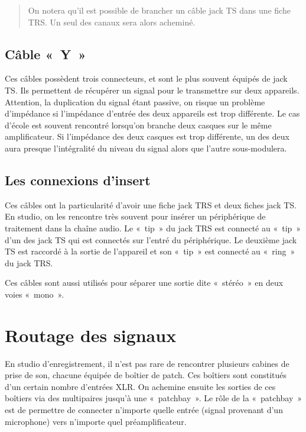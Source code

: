 \documentclass[
]{book}
\begin{document}
\begin{quote}
On notera qu'il est possible de brancher un câble jack TS dans une fiche TRS. Un seul des canaux sera alors acheminé.
\end{quote}

\hypertarget{cuxe2ble-y}{%
\subsection{Câble «~Y~»}\label{cuxe2ble-y}}

Ces câbles possèdent trois connecteurs, et sont le plus souvent équipés de jack TS. Ils permettent de récupérer un signal pour le transmettre sur deux appareils. Attention, la duplication du signal étant passive, on risque un problème d'impédance si l'impédance d'entrée des deux appareils est trop différente. Le cas d'école est souvent rencontré lorsqu'on branche deux casques sur le même amplificateur. Si l'impédance des deux casques est trop différente, un des deux aura presque l'intégralité du niveau du signal alors que l'autre sous-modulera.

\hypertarget{les-connexions-dinsert}{%
\subsection{Les connexions d'insert}\label{les-connexions-dinsert}}

Ces câbles ont la particularité d'avoir une fiche jack TRS et deux fiches jack TS. En studio, on les rencontre très souvent pour insérer un périphérique de traitement dans la chaîne audio. Le «~tip~» du jack TRS est connecté au «~tip~» d'un des jack TS qui est connectés sur l'entré du périphérique. Le deuxième jack TS est raccordé à la sortie de l'appareil et son «~tip~» est connecté au «~ring~» du jack TRS.

Ces câbles sont aussi utilisés pour séparer une sortie dite «~stéréo~» en deux voies «~mono~».

\hypertarget{routage-des-signaux}{%
\section{Routage des signaux}\label{routage-des-signaux}}

En studio d'enregistrement, il n'est pas rare de rencontrer plusieurs cabines de prise de son, chacune équipée de boîtier de patch. Ces boîtiers sont constitués d'un certain nombre d'entrées XLR. On achemine ensuite les sorties de ces boîtiers via des multipaires jusqu'à une «~patchbay~». Le rôle de la «~patchbay~» est de permettre de connecter n'importe quelle entrée (signal provenant d'un microphone) vers n'importe quel préamplificateur.
\end{document}
